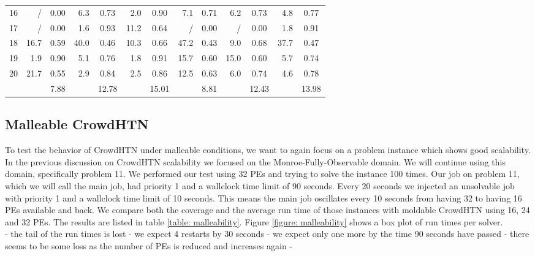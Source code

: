\begin{table}
\begin{tabular}{|l|rc|rc|rc|rc|rc|rc|}
		16 & / & 0.00 & 6.3 & 0.73 & 2.0 & 0.90 & 7.1 & 0.71 & 6.2 & 0.73 & 4.8 & 0.77\\
		17 & / & 0.00 & 1.6 & 0.93 & 11.2 & 0.64 & / & 0.00 & / & 0.00 & 1.8 & 0.91\\
		18 & 16.7 & 0.59 & 40.0 & 0.46 & 10.3 & 0.66 & 47.2 & 0.43 & 9.0 & 0.68 & 37.7 & 0.47\\
		19 & 1.9 & 0.90 & 5.1 & 0.76 & 1.8 & 0.91 & 15.7 & 0.60 & 15.0 & 0.60 & 5.7 & 0.74\\
		20 & 21.7 & 0.55 & 2.9 & 0.84 & 2.5 & 0.86 & 12.5 & 0.63 & 6.0 & 0.74 & 4.6 & 0.78\\
		\hline
		& & 7.88 & & 12.78 & & 15.01 & & 8.81 & & 12.43 & & 13.98\\
		\hline
	\end{tabular}
\end{table}

\subsection{Malleable CrowdHTN}
\label{eval: malleable}
To test the behavior of CrowdHTN under malleable conditions, we want to again focus on a problem instance which shows good scalability. In the previous discussion on CrowdHTN scalability we focused on the Monroe-Fully-Observable domain. We will continue using this domain, specifically problem 11. We performed our test using 32 PEs and trying to solve the instance 100 times. Our job on problem 11, which we will call the main job, had priority 1 and a wallclock time limit of 90 seconds. Every 20 seconds we injected an unsolvable job with priority 1 and a wallclock time limit of 10 seconds. This means the main job oscillates every 10 seconds from having 32 to having 16 PEs available and back. We compare both the coverage and the average run time of those instances with moldable CrowdHTN using 16, 24 and 32 PEs. The results are listed in table \ref{table: malleability}. Figure \ref{figure: malleability} shows a box plot of run times per solver. \\
- the tail of the run times is lost
- we expect 4 restarts by 30 seconds
- we expect only one more by the time 90 seconds have passed
- there seems to be some loss as the number of PEs is reduced and increases again
- 

